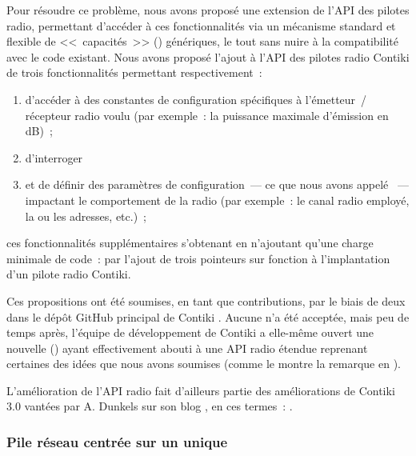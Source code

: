 Pour résoudre ce problème, nous avons proposé une extension de l'API des
pilotes radio, permettant d'accéder à ces fonctionnalités via un mécanisme
standard et flexible de <<~capacités~>> () génériques,
le tout sans nuire à la compatibilité avec le code existant.
Nous avons proposé l'ajout à l'API des pilotes radio Contiki de trois
fonctionnalités permettant respectivement~:
\begin{enumerate}
\item d'accéder à des constantes de configuration spécifiques à l'émetteur~/
récepteur radio voulu (par exemple~: la puissance maximale d'émission en dB)~;
\item d'interroger
\item et de définir des paramètres de configuration~--- ce que nous avons
appelé ~--- impactant le comportement de la radio
(par exemple~: le canal radio employé, la ou les adresses, etc.)~;
\end{enumerate}
ces fonctionnalités supplémentaires s'obtenant en n'ajoutant qu'une
charge minimale de code~: par l'ajout de trois pointeurs sur fonction
à l'implantation d'un pilote radio Contiki.

Ces propositions ont été soumises, en tant que contributions, par le biais
de deux  dans le dépôt GitHub principal de Contiki
\cite{PRContiki1} \cite{PRContiki2}. Aucune n'a été acceptée, mais peu
de temps après, l'équipe de développement de Contiki a elle-même ouvert
une nouvelle  (\cite{PRContiki3}) ayant effectivement
abouti à une API radio étendue reprenant certaines des idées que nous avons
soumises (comme le montre la remarque 
en \cite{PRContiki3}).

L'amélioration de l'API radio fait d'ailleurs partie des améliorations de
Contiki 3.0 vantées par A. Dunkels sur son blog \cite{Contiki3Annonce},
en ces termes~: .

\subsubsection{Pile réseau centrée sur un unique }
\label{ParContikiPacketbuf}

